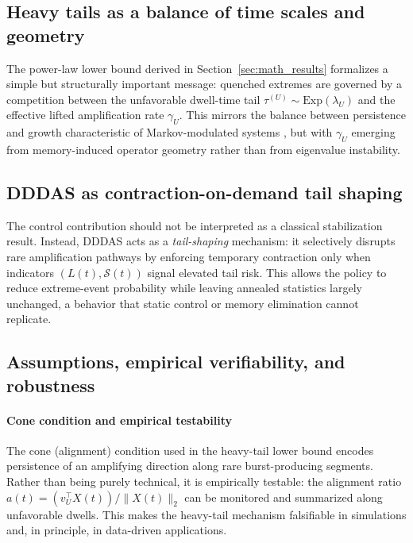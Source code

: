 \documentclass[12pt,a4paper]{article}
\theoremstyle{definition}
\theoremstyle{remark}
\begin{document}
\subsection*{Heavy tails as a balance of time scales and geometry}

The power-law lower bound derived in Section~\ref{sec:math_results}
formalizes a simple but structurally important message:
quenched extremes are governed by a competition between
the unfavorable dwell-time tail
$\tau^{(U)}\sim\mathrm{Exp}(\lambda_U)$
and the effective lifted amplification rate $\gamma_U$.
This mirrors the balance between persistence and growth
characteristic of Markov-modulated systems
\cite{deSaporta2004tails,desaporta2005},
but with $\gamma_U$ emerging from memory-induced operator geometry rather than
from eigenvalue instability.

\subsection*{DDDAS as contraction-on-demand tail shaping}

The control contribution should not be interpreted as a classical stabilization result.
Instead, DDDAS acts as a \emph{tail-shaping} mechanism:
it selectively disrupts rare amplification pathways by enforcing temporary contraction
only when indicators $(L(t),\mathcal S(t))$ signal elevated tail risk.
This allows the policy to reduce extreme-event probability
while leaving annealed statistics largely unchanged,
a behavior that static control or memory elimination cannot replicate.

\subsection*{Assumptions, empirical verifiability, and robustness}

\paragraph{Cone condition and empirical testability}
The cone (alignment) condition used in the heavy-tail lower bound
encodes persistence of an amplifying direction along rare burst-producing segments.
Rather than being purely technical, it is empirically testable:
the alignment ratio
$a(t)=(v_U^\top X(t))/\|X(t)\|_2$
can be monitored and summarized along unfavorable dwells.
This makes the heavy-tail mechanism falsifiable in simulations and, in principle,
in data-driven applications.
\end{document}
